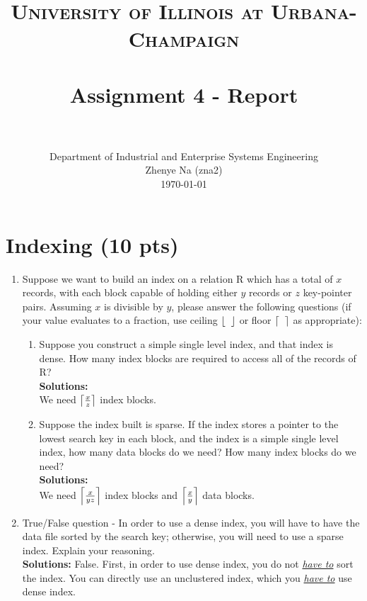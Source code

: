 \documentclass[paper=a4, fontsize=11pt]{scrartcl}
\title{
	\usefont{OT1}{bch}{b}{n}
	\normalfont \normalsize \textsc{University of Illinois at Urbana-Champaign} \\ [25pt]
	\horrule{0.5pt} \\[0.4cm]
	\huge Assignment 4 - Report \\
	\horrule{2pt} \\[0.5cm]
}
\author{
	\normalfont 								\normalsize
	Department of Industrial and Enterprise Systems Engineering\\
	\normalsize Zhenye Na (zna2)\\[-3pt]		\normalsize
	\today
}
\date{}
\DeclarePairedDelimiter\ceil{\lceil}{\rceil}
\DeclarePairedDelimiter\floor{\lfloor}{\rfloor}
\numberwithin{equation}{section}		%
\numberwithin{figure}{section}			%
\numberwithin{table}{section}				%
\begin{document}
	\maketitle
	
	\section{Indexing (10 pts)}
	
	\begin{enumerate}
		\item Suppose we want to build an index on a relation R which has a total of $x$ records, with each block capable of holding either $y$ records or $z$ key-pointer pairs. Assuming $x$ is divisible by $y$, please answer the following questions (if your value evaluates to a fraction, use ceiling $\floor*{\;\;}$ or floor $\ceil*{\;\;}$ as appropriate):
		
		\begin{enumerate}
			\item Suppose you construct a simple single level index, and that index is dense. How many index blocks are required to access all of the records of R?\\
			\textbf{Solutions: }\\
			We need $\ceil*{\frac{x}{z}}$ index blocks.\\
			
			\item Suppose the index built is sparse. If the index stores a pointer to the lowest search key in each block, and the index is a simple single level index, how many data blocks do we need? How many index blocks do we need?\\
			\textbf{Solutions: }\\
			We need $\ceil*{\frac{x}{yz}}$ index blocks and $\ceil*{\frac{x}{y}}$ data blocks.
			
		\end{enumerate}
		
		
		
		\item True/False question - In order to use a dense index, you will have to have the data file sorted by the search key; otherwise, you will need to use a sparse index. Explain your reasoning.\\
		\textbf{Solutions: }False. First, in order to use dense index, you do not \underline{\textit{have to}} sort the index. You can directly use an unclustered index, which you \underline{\textit{have to}} use dense index.
		
		
	\end{enumerate}
	
\end{document}
